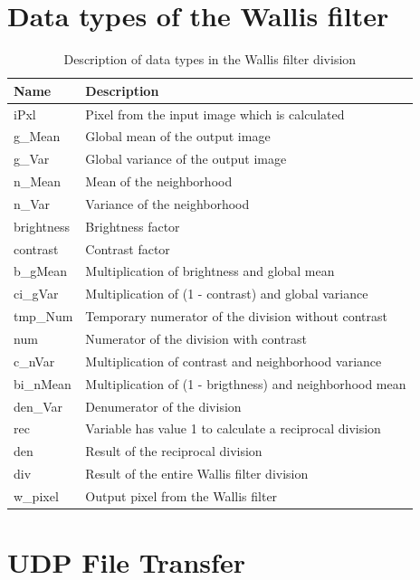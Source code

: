 \section{Data types of the Wallis filter} \label{app:datatypes}
\begin{table}[H]
    \centering
    \begin{tabularx}{\textwidth}{l l}
        \toprule
        Name & Description \\
        \midrule
        iPxl & 			Pixel from the input image which is calculated \\
        g\_Mean &  		Global mean of the output image \\
        g\_Var &  		Global variance of the output image \\
        n\_Mean &		Mean of the neighborhood \\
        n\_Var &  		Variance of the neighborhood \\
        brightness & 	Brightness factor \\
        contrast & 		Contrast factor \\
        b\_gMean &  	Multiplication of brightness and global mean\\
        ci\_gVar &  	Multiplication of (1 - contrast) and global variance\\
        tmp\_Num &  	Temporary numerator of the division without contrast\\
        num &   		Numerator of the division with contrast\\
        c\_nVar &  		Multiplication of contrast and neighborhood variance\\
        bi\_nMean &  	Multiplication of (1 - brigthness) and neighborhood mean\\
        den\_Var & 		Denumerator of the division \\
        rec & 			Variable has value 1 to calculate a reciprocal division\\
        den & 			Result of the reciprocal division\\
        div &  			Result of the entire Wallis filter division\\
        w\_pixel &  	Output pixel from the Wallis filter\\
        \bottomrule
    \end{tabularx}
    \caption{Description of data types in the Wallis filter division}
\end{table}

\clearpage

\section{UDP File Transfer} \label{app:uftspec}


